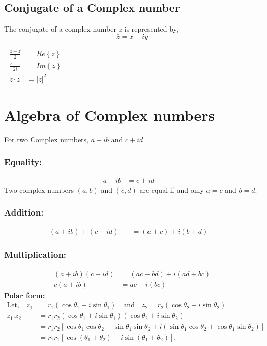      \subsection{Conjugate of a Complex number}
	The conjugate of a complex number $z$ is represented by, $${\bar{z}=x-i y}$$
	\begin{note}\newline 
	$ \left. \right. $ \hspace{1.5cm}	
	$\begin{aligned}
		\frac{z + \bar{z}}{2}&=Re\left\lbrace z\right\rbrace \\
		\frac{z - \bar{z}}{2i}&=Im\left\lbrace z\right\rbrace\\
		z \cdot \bar{z}&=|z|^{2}
		\end{aligned}$
	\end{note}
\section{Algebra of Complex numbers}
For two Complex numbers, $a+i b$ and $c+i d $
\subsubsection{Equality:}
	\begin{align*}
	a+i b&=c+i d \quad
	\end{align*}
	Two complex numbers $(a, b)$
 and $(c, d)$ are equal if and only $a=c$ and $b=d$.
 \subsubsection{Addition:} 
 \begin{align*}
 (a+i b)+(c+i d) \quad&=(a+c)+i(b+d) \quad
 \end{align*}
 \subsubsection{Multiplication:} \begin{align*}
 (a+i b)(c+i d) &=(a c-b d)+i(a d+b c) \\
 c(a+i b)&=a c+i(b c)
 \end{align*}
 \textbf{Polar form:} 
 \begin{align*} 
 \text{Let,} \quad z_{1}&=r_{1}\left(\cos \theta_{1}+i \sin \theta_{1}\right) \quad \text{and}\quad z_{2}=r_{2}\left(\cos \theta_{2}+i \sin \theta_{2}\right)\\
 z_{1} . z_{2} &=r_{1} r_{2}\left(\cos \theta_{1}+i \sin \theta_{1}\right)\left(\cos \theta_{2}+i \sin \theta_{2}\right) \\ &=r_{1} r_{2}\left[\cos \theta_{1} \cos \theta_{2}-\sin \theta_{1} \sin \theta_{2}+i\left(\sin \theta_{1} \cos \theta_{2}+\cos \theta_{1} \sin \theta_{2}\right)\right] \\ &=r_{1} r_{1}\left[\cos \left(\theta_{1}+\theta_{2}\right)+i \sin \left(\theta_{1}+\theta_{2}\right)\right], \end{align*}
 
